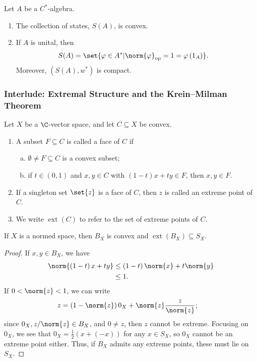 \documentclass[10pt]{mypackage}
\DeclareMathOperator{\op}{op}
\begin{document}
\begin{corollary}
  Let $A$ be a $C^{\ast}$-algebra.
  \begin{enumerate}[(1)]
    \item The collection of states, $S(A)$, is convex.
    \item If $A$ is unital, then
      \begin{align*}
        S(A) &= \set{\varphi\in A^{\ast} | \norm{\varphi}_{\op} = 1 = \varphi\left(1_A\right)}.
      \end{align*}
      Moreover, $\left(S\left(A\right),w^{\ast}\right)$ is compact.
  \end{enumerate}
\end{corollary}
\subsubsection{Interlude: Extremal Structure and the Krein--Milman Theorem}%
\begin{definition}[]
  Let $X$ be a $\C$-vector space, and let $C\subseteq X$ be convex.
  \begin{enumerate}[(1)]
    \item A subset $F\subseteq C$ is called a face of $C$ if
      \begin{enumerate}[(a)]
        \item $\emptyset\neq F\subseteq C$ is a convex subset;
        \item if $t\in (0,1)$ and $x,y\in C$ with $\left(1-t\right)x + ty \in F$, then $x,y\in F$.
      \end{enumerate}
    \item If a singleton set $\set{z}$ is a face of $C$, then $z$ is called an extreme point of $C$.
    \item We write $\operatorname{ext}\left(C\right)$ to refer to the set of extreme points of $C$.
  \end{enumerate}
\end{definition}
\begin{fact}
  If $X$ is a normed space, then $B_{X}$ is convex and $\operatorname{ext}\left(B_X\right) \subseteq S_{X}$.
\end{fact}
\begin{proof}
  If $x,y\in B_{X}$, we have
  \begin{align*}
    \norm{\left(1-t\right)x + ty} &\leq \left(1-t\right)\norm{x} + t\norm{y}\\
                                  &\leq 1.
  \end{align*}
  If $0 < \norm{z} < 1$, we can write
  \begin{align*}
    z &= \left(1-\norm{z}\right)0_X + \norm{z}\frac{z}{\norm{z}};
  \end{align*}
  since $0_X,z/\norm{z}\in B_X$, and $0\neq z$, then $z$ cannot be extreme. Focusing on $0_X$, we see that $0_X = \frac{1}{2}\left(x + (-x)\right)$ for any $x\in S_X$, so $0_X$ cannot be an extreme point either. Thus, if $B_X$ admits any extreme points, these must lie on $S_X$.
\end{proof}
\end{document}
